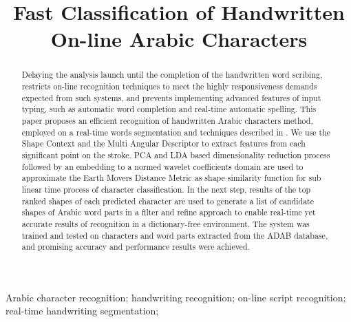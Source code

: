 \documentclass[10pt, conference, compsocconf]{IEEEtran}
\begin{document}
\title{Fast Classification of Handwritten On-line Arabic Characters}

\author{
\and
{}
}


\maketitle

\begin{abstract}
Delaying the analysis launch until the completion of the handwritten word scribing, restricts on-line recognition techniques to meet the highly responsiveness demands expected from such systems, and prevents implementing advanced features of input typing, such as automatic word completion and real-time automatic spelling.
This paper proposes an efficient recognition of handwritten Arabic characters method, employed on a real-time words segmentation and techniques described in \cite{kour2014real}.
We use the Shape Context and the Multi Angular Descriptor to extract features from each significant point on the stroke. 
PCA and LDA based dimensionality reduction process followed by an embedding to a normed wavelet coefficients domain are used to approximate the Earth Movers Distance Metric as shape similarity function for sub linear time process of character classification. 
In the next step, results of the top ranked shapes of each predicted character are used to generate a list of candidate shapes of Arabic word parts in a filter and refine approach to enable real-time yet accurate results of recognition in a dictionary-free environment.
The system was trained and tested on characters and word parts extracted from the ADAB database, and promising accuracy and performance results were achieved.
\end{abstract}

\begin{IEEEkeywords}
Arabic character recognition; handwriting recognition; on-line script recognition; real-time handwriting segmentation;
\end{IEEEkeywords}
\end{document}
